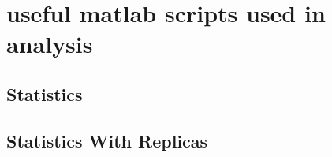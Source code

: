 \documentclass[aps,letterpaper,10pt]{revtex4}
\begin{document}
\newpage
\appendix
    \section{useful matlab scripts used in analysis}
        \subsection{Statistics}
            
        \subsection{Statistics With Replicas}
            


\end{document}
